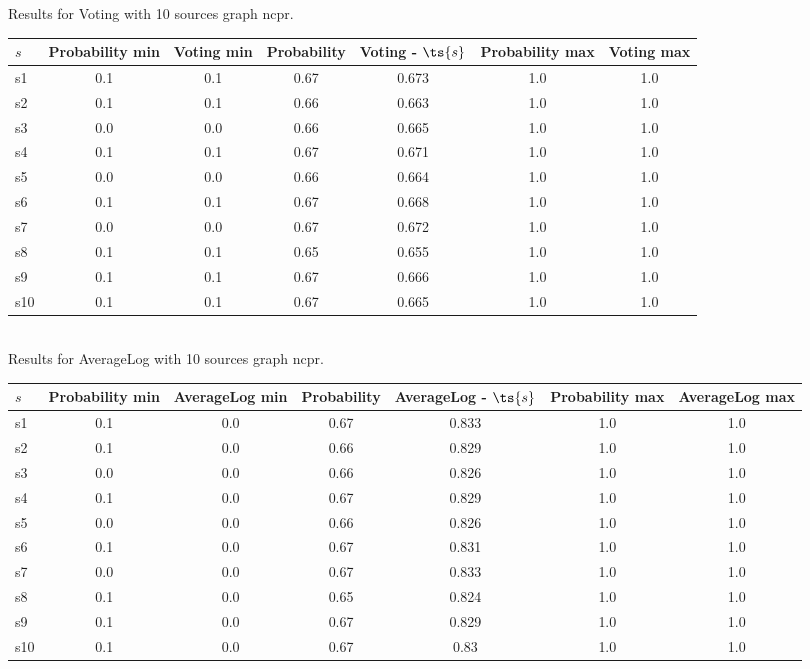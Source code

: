 \documentclass{article}
\begin{document}
\noindent Results for Voting with 10 sources graph ncpr.

\noindent\begin{tabular}{|l|c|c|c|c|c|c|}
\hline
$s$& Probability min & Voting min & Probability & Voting - $\ts{s}$ & Probability max & Voting max\\
\hline
s1 &0.1 & 0.1 & 0.67 & 0.673 & 1.0 & 1.0\\
\hline
s2 &0.1 & 0.1 & 0.66 & 0.663 & 1.0 & 1.0\\
\hline
s3 &0.0 & 0.0 & 0.66 & 0.665 & 1.0 & 1.0\\
\hline
s4 &0.1 & 0.1 & 0.67 & 0.671 & 1.0 & 1.0\\
\hline
s5 &0.0 & 0.0 & 0.66 & 0.664 & 1.0 & 1.0\\
\hline
s6 &0.1 & 0.1 & 0.67 & 0.668 & 1.0 & 1.0\\
\hline
s7 &0.0 & 0.0 & 0.67 & 0.672 & 1.0 & 1.0\\
\hline
s8 &0.1 & 0.1 & 0.65 & 0.655 & 1.0 & 1.0\\
\hline
s9 &0.1 & 0.1 & 0.67 & 0.666 & 1.0 & 1.0\\
\hline
s10 &0.1 & 0.1 & 0.67 & 0.665 & 1.0 & 1.0\\
\hline
\end{tabular}\\

\noindent Results for AverageLog with 10 sources graph ncpr.

\noindent\begin{tabular}{|l|c|c|c|c|c|c|}
\hline
$s$& Probability min & AverageLog min & Probability & AverageLog - $\ts{s}$ & Probability max & AverageLog max\\
\hline
s1 &0.1 & 0.0 & 0.67 & 0.833 & 1.0 & 1.0\\
\hline
s2 &0.1 & 0.0 & 0.66 & 0.829 & 1.0 & 1.0\\
\hline
s3 &0.0 & 0.0 & 0.66 & 0.826 & 1.0 & 1.0\\
\hline
s4 &0.1 & 0.0 & 0.67 & 0.829 & 1.0 & 1.0\\
\hline
s5 &0.0 & 0.0 & 0.66 & 0.826 & 1.0 & 1.0\\
\hline
s6 &0.1 & 0.0 & 0.67 & 0.831 & 1.0 & 1.0\\
\hline
s7 &0.0 & 0.0 & 0.67 & 0.833 & 1.0 & 1.0\\
\hline
s8 &0.1 & 0.0 & 0.65 & 0.824 & 1.0 & 1.0\\
\hline
s9 &0.1 & 0.0 & 0.67 & 0.829 & 1.0 & 1.0\\
\hline
s10 &0.1 & 0.0 & 0.67 & 0.83 & 1.0 & 1.0\\
\hline
\end{tabular}\\
\end{document}
